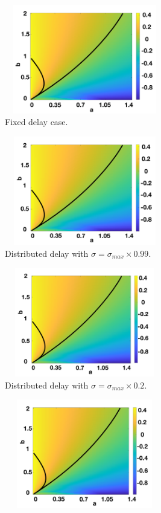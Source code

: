 \documentclass[12pt]{report}
\begin{document}
\begin{figure}[H]
    \centering
    \begin{subfigure}[b]{0.45\textwidth}
        \centering
        \includegraphics[width=7cm,height=4.75cm]{t1f1.png}
        \caption{Fixed delay case.}
        \label{}
    \end{subfigure}
    \hfill
    \begin{subfigure}[b]{0.45\textwidth}
        \centering
        \includegraphics[width=7cm,height=4.75cm]{t1f2.png}
        \caption{Distributed delay with $\sigma=\sigma_{max}\times0.99$.}
        \label{}
    \end{subfigure}
    \hfill
    \begin{subfigure}[b]{0.45\textwidth}
        \centering
        \includegraphics[width=7cm,height=4.75cm]{t1f3.png}
        \caption{Distributed delay with $\sigma=\sigma_{max}\times0.2$.}
        \label{}
    \end{subfigure}
    \hfill
    \begin{subfigure}[b]{0.45\textwidth}
        \centering
        \includegraphics[width=7cm,height=4.75cm]{t1f4.png}

\end{subfigure}
\end{figure}
\end{document}
